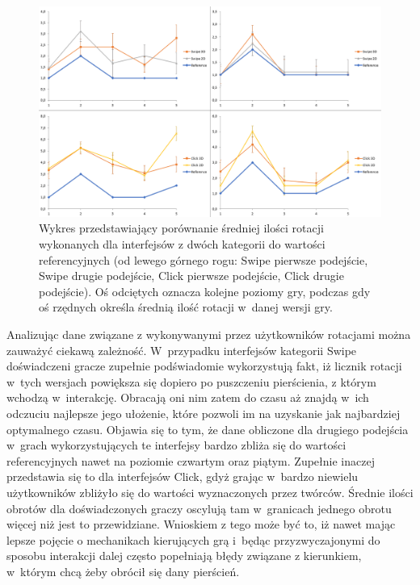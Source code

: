 \documentclass[a4paper,12pt,numbers=noenddot]{report}
\begin{document}
\begin{figure}[h!]
	\centering
  	\includegraphics[width=\linewidth]{diag/ref_rotations.png}
	\caption{Wykres przedstawiający porównanie średniej ilości rotacji wykonanych dla interfejsów z dwóch kategorii do wartości referencyjnych (od lewego górnego rogu: Swipe pierwsze podejście, Swipe drugie podejście, Click pierwsze podejście, Click drugie podejście). Oś odciętych oznacza kolejne poziomy gry, podczas gdy oś rzędnych określa średnią ilość rotacji w~danej wersji gry.}
	\label{fig:ref:rotations}
\end{figure}

Analizując dane związane z wykonywanymi przez użytkowników rotacjami można zauważyć ciekawą zależność. W~przypadku interfejsów kategorii Swipe doświadczeni gracze zupełnie podświadomie wykorzystują fakt, iż licznik rotacji w~tych wersjach powiększa się dopiero po puszczeniu pierścienia, z którym wchodzą w~interakcję. Obracają oni nim zatem do czasu aż znajdą w~ich odczuciu najlepsze jego ułożenie, które pozwoli im na uzyskanie jak najbardziej optymalnego czasu. Objawia się to tym, że dane obliczone dla drugiego podejścia w~grach wykorzystujących te interfejsy bardzo zbliża się do wartości referencyjnych nawet na poziomie czwartym oraz piątym. Zupełnie inaczej przedstawia się to dla interfejsów Click, gdyż grając w~bardzo niewielu użytkowników zbliżyło się do wartości wyznaczonych przez twórców. Średnie ilości obrotów dla doświadczonych graczy oscylują tam w~granicach jednego obrotu więcej niż jest to przewidziane. Wnioskiem z tego może być to, iż nawet mając lepsze pojęcie o mechanikach kierujących grą i~będąc przyzwyczajonymi do sposobu interakcji dalej często popełniają błędy związane z kierunkiem, w~którym chcą żeby obrócił się dany pierścień.
\end{document}
